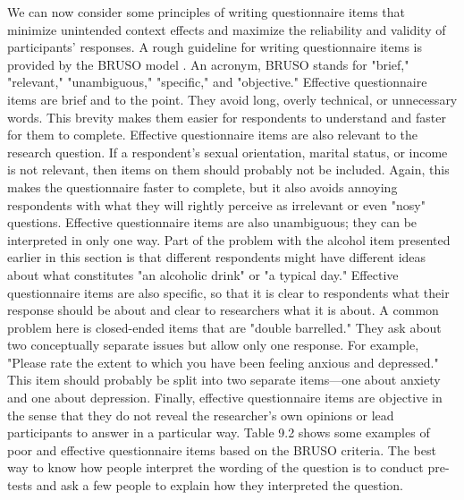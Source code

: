We can now consider some principles of writing questionnaire items that minimize unintended context effects and maximize the reliability and validity of participants’ responses. A rough guideline for writing questionnaire items is provided by the BRUSO model \citep{peterson_constructing_2000}. An acronym, BRUSO stands for "brief," "relevant," "unambiguous," "specific," and "objective." Effective questionnaire items are brief and to the point. They avoid long, overly technical, or unnecessary words. This brevity makes them easier for respondents to understand and faster for them to complete. Effective questionnaire items are also relevant to the research question. If a respondent’s sexual orientation, marital status, or income is not relevant, then items on them should probably not be included. Again, this makes the questionnaire faster to complete, but it also avoids annoying respondents with what they will rightly perceive as irrelevant or even "nosy" questions. Effective questionnaire items are also unambiguous; they can be interpreted in only one way. Part of the problem with the alcohol item presented earlier in this section is that different respondents might have different ideas about what constitutes "an alcoholic drink" or "a typical day." Effective questionnaire items are also specific, so that it is clear to respondents what their response should be about and clear to researchers what it is about. A common problem here is closed-ended items that are "double barrelled." They ask about two conceptually separate issues but allow only one response. For example, "Please rate the extent to which you have been feeling anxious and depressed." This item should probably be split into two separate items---one about anxiety and one about depression. Finally, effective questionnaire items are objective in the sense that they do not reveal the researcher’s own opinions or lead participants to answer in a particular way. Table 9.2 shows some examples of poor and effective questionnaire items based on the BRUSO criteria. The best way to know how people interpret the wording of the question is to conduct pre-tests and ask a few people to explain how they interpreted the question.



